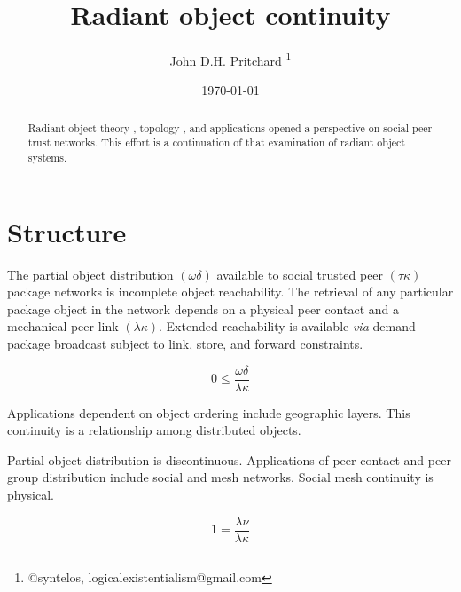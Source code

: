 \documentclass[12pt,twocolumn]{article}
\begin{document}
\title{Radiant object continuity}

\author{John D.H. Pritchard \thanks{@syntelos, logicalexistentialism@gmail.com}}

\date{\today}

\maketitle


\begin{abstract}

Radiant object theory \cite{ROTI}, topology \cite{ROTY}, and
applications \cite{ROTA} opened a perspective on social peer trust
networks.  This effort is a continuation of that examination of
radiant object systems.
  
\end{abstract}


\section{Structure}

The partial object distribution \((\omega\delta)\) available to social
trusted peer \((\tau\kappa)\) package networks is incomplete object
reachability.  The retrieval of any particular package object in the
network depends on a physical peer contact and a mechanical peer link
\((\lambda\kappa)\).  Extended reachability is available {\it via}
demand package broadcast subject to link, store, and forward
constraints.

$$
 0 \le \frac{\omega\delta}{\lambda\kappa}
$$

Applications dependent on object ordering include geographic layers.
This continuity is a relationship among distributed objects.

Partial object distribution is discontinuous.  Applications of peer
contact and peer group distribution include social and mesh networks.
Social mesh continuity is physical.

$$
 1 = \frac{\lambda\nu}{\lambda\kappa}
$$

\appendix



\end{document}
